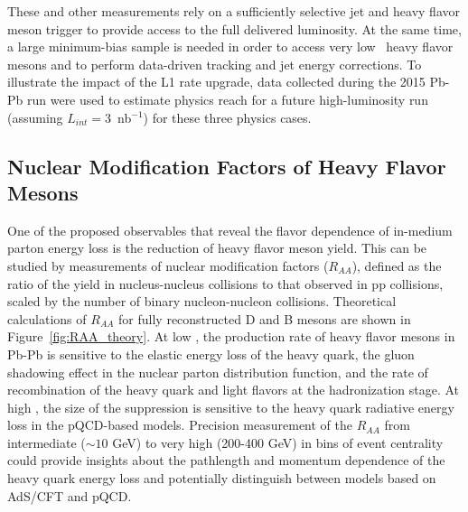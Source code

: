 These and other measurements rely on a sufficiently selective jet and heavy flavor meson trigger to provide access to the full delivered luminosity. At the same time, a large minimum-bias sample is needed in order to access very low \pt\ heavy flavor mesons and to perform data-driven tracking and jet energy corrections.  To illustrate the impact of the L1 rate upgrade, data collected during the 2015 Pb-Pb run were used to estimate physics reach for a future high-luminosity run (assuming $L_{int} =$3~nb$^{-1}$) for these three physics cases. 


\subsection{Nuclear Modification Factors of Heavy Flavor Mesons}

One of the proposed observables that reveal the flavor dependence of in-medium parton energy loss is the reduction of heavy flavor meson yield. This can be studied by measurements of nuclear modification factors ($R_{AA}$), defined as the ratio of the yield in nucleus-nucleus collisions to that observed in pp collisions, scaled by the number of binary nucleon-nucleon collisions. Theoretical calculations of $R_{AA}$ for fully reconstructed D and B mesons are shown in Figure~\ref{fig:RAA_theory}. At low \pt, the production rate of heavy flavor mesons in Pb-Pb is sensitive to the elastic energy loss of the heavy quark, the gluon shadowing effect in the nuclear parton distribution function, and the rate of recombination of the heavy quark and light flavors at the hadronization stage. At high \pt, the size of the suppression is sensitive to the heavy quark radiative energy loss in the pQCD-based models. Precision measurement of the $R_{AA}$ from intermediate \pt ($\sim 10$ GeV) to very high \pt (200-400 GeV) in bins of event centrality could provide insights about the pathlength and momentum dependence of the heavy quark energy loss and potentially distinguish between models based on AdS/CFT and pQCD. 

